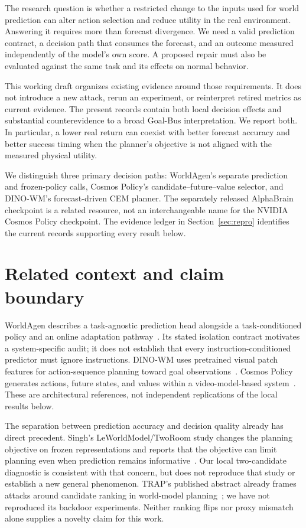 \documentclass[11pt]{article}
\begin{document}
The research question is whether a restricted change to the inputs used for
world prediction can alter action selection and reduce utility in the real
environment. Answering it requires more than forecast divergence. We need a
valid prediction contract, a decision path that consumes the forecast, and an
outcome measured independently of the model's own score. A proposed repair
must also be evaluated against the same task and its effects on normal behavior.

This working draft organizes existing evidence around those requirements. It
does not introduce a new attack, rerun an experiment, or reinterpret retired
metrics as current evidence. The present records contain both local decision
effects and substantial counterevidence to a broad Goal-Bus interpretation.
We report both. In particular, a lower real return can coexist with better
forecast accuracy and better success timing when the planner's objective is
not aligned with the measured physical utility.

We distinguish three primary decision paths: WorldAgen's separate prediction
and frozen-policy calls, Cosmos Policy's candidate--future--value selector,
and DINO-WM's forecast-driven CEM planner. The separately released AlphaBrain
checkpoint is a related resource, not an interchangeable name for the NVIDIA
Cosmos Policy checkpoint. The evidence ledger in Section~\ref{sec:repro}
identifies the current records supporting every result below.

\section{Related context and claim boundary}

WorldAgen describes a task-agnostic prediction head alongside a task-conditioned
policy and an online adaptation pathway~\cite{worldagen}. Its stated isolation
contract motivates a system-specific audit; it does not establish that every
instruction-conditioned predictor must ignore instructions. DINO-WM uses
pretrained visual patch features for action-sequence planning toward goal
observations~\cite{dinowm}. Cosmos Policy generates actions, future states, and
values within a video-model-based system~\cite{cosmos}. These are architectural
references, not independent replications of the local results below.

The separation between prediction accuracy and decision quality already has
direct precedent. Singh's LeWorldModel/TwoRoom study changes the planning
objective on frozen representations and reports that the objective can limit
planning even when prediction remains informative~\cite{objective}. Our local
two-candidate diagnostic is consistent with that concern, but does not reproduce
that study or establish a new general phenomenon. TRAP's published abstract
already frames attacks around candidate ranking in world-model
planning~\cite{trap}; we have not reproduced its backdoor experiments. Neither
ranking flips nor proxy mismatch alone supplies a novelty claim for this work.
\end{document}
